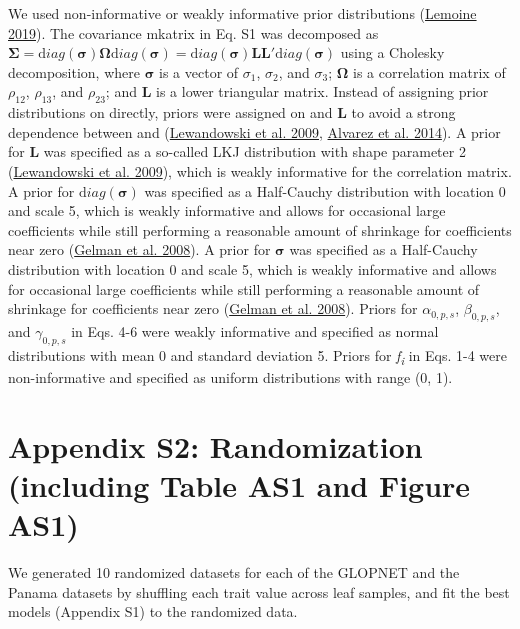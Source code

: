 \documentclass[
  12pt,
  letterpaper,
  DIV=11,
  numbers=noendperiod]{scrartcl}
\begin{document}
We used non-informative or weakly informative prior distributions
(\protect\hyperlink{ref-Lemoine2019}{Lemoine 2019}). The covariance
mkatrix in Eq. S1 was decomposed as
\({\mathbf \Sigma} = {\mathrm diag}({\mathbf \sigma}){\mathbf \Omega}{\mathrm diag}({\mathbf \sigma}) = {\mathrm diag}({\mathbf \sigma}){\mathbf L}{\mathbf L}\prime {\mathrm diag}({\mathbf \sigma})\)
using a Cholesky decomposition, where \({\mathbf \sigma}\) is a vector
of \(\sigma_{1}\), \(\sigma_{2}\), and \(\sigma_{3}\);
\({\mathbf \Omega}\) is a correlation matrix of \(\rho_{12}\),
\(\rho_{13}\), and \(\rho_{23}\); and \textbf{L} is a lower triangular
matrix. Instead of assigning prior distributions on directly, priors
were assigned on and \textbf{L} to avoid a strong dependence between and
(\protect\hyperlink{ref-Lewandowski2009}{Lewandowski et al. 2009},
\protect\hyperlink{ref-Alvarez2014}{Alvarez et al. 2014}). A prior for
\textbf{L} was specified as a so-called LKJ distribution with shape
parameter 2 (\protect\hyperlink{ref-Lewandowski2009}{Lewandowski et al.
2009}), which is weakly informative for the correlation matrix. A prior
for \({\mathrm diag}({\mathbf \sigma})\) was specified as a Half-Cauchy
distribution with location 0 and scale 5, which is weakly informative
and allows for occasional large coefficients while still performing a
reasonable amount of shrinkage for coefficients near zero
(\protect\hyperlink{ref-Gelman2008}{Gelman et al. 2008}). A prior for
\(\mathbf{\sigma}\) was specified as a Half-Cauchy distribution with
location 0 and scale 5, which is weakly informative and allows for
occasional large coefficients while still performing a reasonable amount
of shrinkage for coefficients near zero
(\protect\hyperlink{ref-Gelman2008}{Gelman et al. 2008}). Priors for
\(\alpha_{0,p,s}\), \(\beta_{0,p,s}\), and \(\gamma_{0,p,s}\) in Eqs.
4-6 were weakly informative and specified as normal distributions with
mean 0 and standard deviation 5. Priors for \emph{f\textsubscript{i}} in
Eqs. 1-4 were non-informative and specified as uniform distributions
with range (0, 1).

\newpage

\hypertarget{appendix-s2-randomization-including-table-as1-and-figure-as1}{%
\section{Appendix S2: Randomization (including Table AS1 and Figure
AS1)}\label{appendix-s2-randomization-including-table-as1-and-figure-as1}}

We generated 10 randomized datasets for each of the GLOPNET and the
Panama datasets by shuffling each trait value across leaf samples, and
fit the best models (Appendix S1) to the randomized data.
\end{document}
